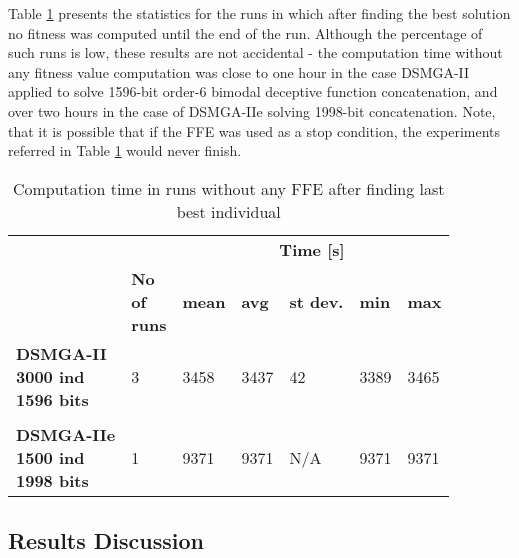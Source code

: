Table \ref{tab:TimeAfterTotalStuck} presents the statistics for the runs in which after finding the best solution no fitness was computed until the end of the run. Although the percentage of such runs is low, these results are not accidental - the computation time without any fitness value computation was close to one hour in the case DSMGA-II applied to solve 1596-bit order-6 bimodal deceptive function concatenation, and over two hours in the case of DSMGA-IIe solving 1998-bit concatenation. Note, that it is possible that if the FFE was used as a stop condition, the experiments referred in Table \ref{tab:TimeAfterTotalStuck} would never finish.



\begin{table}[]
	\centering
	\caption{Computation time in runs without any FFE after finding last best individual}
	\label{tab:TimeAfterTotalStuck}
	\begin{tabular}{lllllll}
		\toprule
		&  &          \multicolumn{5}{c}{\textbf{Time {[}s{]}}} \\
		& \pbox{20cm}{\textbf{No}\\\textbf{of}\\\textbf{runs}} & \textbf{mean}    & \textbf{avg}     & \textbf{st dev.} & \textbf{min}     & \textbf{max}     \\
		\midrule
		\pbox{20cm}{\textbf{DSMGA-II}\\\textbf{3000 ind}\\\textbf{1596 bits}}     & 3              & 3458 & 3437 & 42      & 3389 & 3465 \\
		 &                &         &         &         &         &         \\
		\pbox{20cm}{\textbf{DSMGA-IIe}\\\textbf{1500 ind}\\\textbf{1998 bits}}    & 1              & 9371 & 9371 & N/A     & 9371 & 9371 \\
		\bottomrule
	\end{tabular}
\end{table}


\subsection{Results Discussion}

